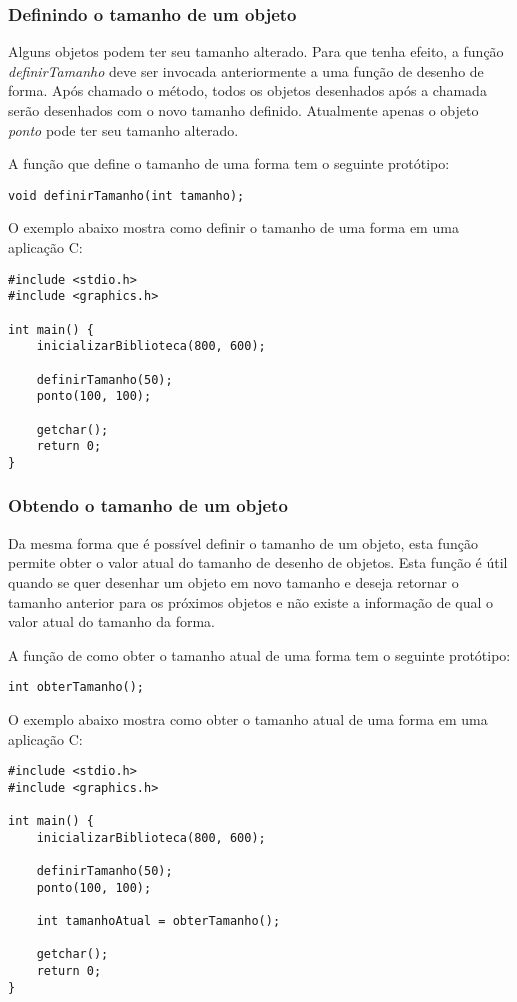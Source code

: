 \documentclass[12pt, %
openright,
oneside, %
a4paper,    %
brazil]{facom-ufu-abntex2}
\begin{document}
\subsubsection{Definindo o tamanho de um objeto}
Alguns objetos podem ter seu tamanho alterado. Para que tenha efeito, a função \textit{definirTamanho} deve ser invocada anteriormente a uma função de desenho de forma. Após chamado o método, todos os objetos desenhados após a chamada serão desenhados com o novo tamanho definido. Atualmente apenas o objeto \textit{ponto} pode ter seu tamanho alterado.

A função que define o tamanho de uma forma tem o seguinte protótipo:

\begin{verbatim}
void definirTamanho(int tamanho);
\end{verbatim}

O exemplo abaixo mostra como definir o tamanho de uma forma em uma aplicação C:

\begin{verbatim}
#include <stdio.h>
#include <graphics.h>

int main() {
    inicializarBiblioteca(800, 600);

    definirTamanho(50);
    ponto(100, 100);

    getchar();
    return 0;
}
\end{verbatim}

\subsubsection{Obtendo o tamanho de um objeto}
Da mesma forma que é possível definir o tamanho de um objeto, esta função permite obter o valor atual do tamanho de desenho de objetos. Esta função é útil quando se quer desenhar um objeto em novo tamanho e deseja retornar o tamanho anterior para os próximos objetos e não existe a informação de qual o valor atual do tamanho da forma.

A função de como obter o tamanho atual de uma forma tem o seguinte protótipo:

\begin{verbatim}
int obterTamanho();
\end{verbatim}

O exemplo abaixo mostra como obter o tamanho atual de uma forma em uma aplicação C:

\begin{verbatim}
#include <stdio.h>
#include <graphics.h>

int main() {
    inicializarBiblioteca(800, 600);

    definirTamanho(50);
    ponto(100, 100);

    int tamanhoAtual = obterTamanho();

    getchar();
    return 0;
}
\end{verbatim}
\end{document}
